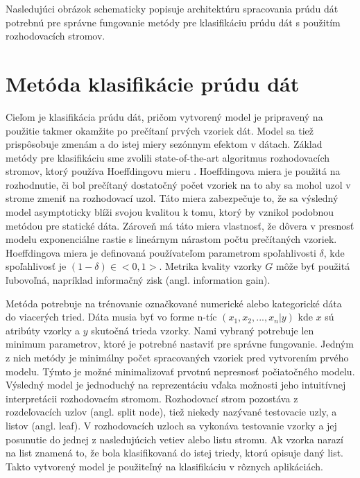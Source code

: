 Nasledujúci obrázok schematicky popisuje architektúru spracovania prúdu dát potrebnú pre správne fungovanie metódy pre klasifikáciu prúdu dát s použitím rozhodovacích stromov.



\section{Metóda klasifikácie prúdu dát}
\label{method-klasifikacia-prudu-dat}
Cieľom je klasifikácia prúdu dát, pričom vytvorený model je pripravený na použitie takmer okamžite po prečítaní prvých vzoriek dát. Model sa tiež prispôsobuje zmenám a do istej miery sezónnym efektom v dátach. Základ metódy pre klasifikáciu sme zvolili state-of-the-art algoritmus rozhodovacích stromov, ktorý používa Hoeffdingovu mieru \citep{domingos2000mining, gaber2005mining, krempl2014open}. Hoeffdingova miera je použitá na rozhodnutie, či bol prečítaný dostatočný počet vzoriek na to aby sa mohol uzol v strome zmeniť na rozhodovací uzol. Táto miera zabezpečuje to, že sa výsledný model asymptoticky blíži svojou kvalitou k tomu, ktorý by vznikol podobnou metódou pre statické dáta. Zároveň má táto miera vlastnosť, že  dôvera v presnosť modelu exponenciálne rastie s lineárnym nárastom počtu prečítaných vzoriek. Hoeffdingova miera je definovaná používateľom parametrom spoľahlivosti $\delta$, kde spoľahlivosť je $(1-\delta) \in <0,1>$. Metrika kvality vzorky $G$ môže byť použitá ľubovoľná, napríklad informačný zisk (angl. information gain).
\par
Metóda potrebuje na trénovanie označkované numerické alebo kategorické dáta do viacerých tried. Dáta musia byť vo forme n-tíc $(x_1, x_2, ..., x_n | y)$ kde $x$ sú atribúty vzorky a $y$ skutočná trieda vzorky. Nami vybraný potrebuje len minimum parametrov, ktoré je potrebné nastaviť pre správne fungovanie. Jedným z nich metódy je minimálny počet spracovaných vzoriek pred vytvorením prvého modelu. Týmto je možné minimalizovať prvotnú nepresnosť počiatočného modelu. Výsledný model je jednoduchý na reprezentáciu vďaka možnosti jeho intuitívnej interpretácii rozhodovacím stromom. Rozhodovací strom pozostáva z rozdeľovacích uzlov (angl. split node), tiež niekedy nazývané testovacie uzly, a listov (angl. leaf). V rozhodovacích uzloch sa vykonáva testovanie vzorky a jej posunutie do jednej z nasledujúcich vetiev alebo listu stromu. Ak vzorka narazí na list znamená to, že bola klasifikovaná do istej triedy, ktorú opisuje daný list. Takto vytvorený model je použiteľný na klasifikáciu v rôznych aplikáciách.
